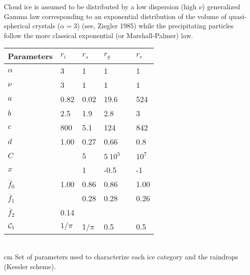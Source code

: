 Cloud ice is assumed to be distributed by a low dispersion (high $\nu$)
generalized Gamma law corresponding to an exponential distribution of the volume
of quasi-spherical crystals ($\alpha = 3$) (see, Ziegler 1985) while the
precipitating particles follow the more classical exponential (or
Marshall-Palmer) law.

\begin{center}\label{table2}
\begin{tabular}{|l|l|l|l|l|l|}
\hline
Parameters & $r_i$ & $r_s$ & $r_g$ && $r_r$  \\
\hline \hline
$\alpha$ & 3 & 1 & 1 && 1 \\
$\nu$    & 3 & 1 & 1 && 1 \\
\hline
$a$ & 0.82 & 0.02 & 19.6 && 524 \\
$b$ & 2.5  & 1.9  & 2.8 && 3   \\
\hline
$c$ & 800  & 5.1  & 124 && 842 \\
$d$ & 1.00 & 0.27 & 0.66 && 0.8 \\
\hline
$C$ & & 5 & $5\ 10^5$ && $10^7$ \\
$x$ & & 1 &    -0.5   &&   -1   \\
\hline
$\overline{f}_0$ & 1.00 & 0.86 & 0.86 && 1.00 \\
$\overline{f}_1$ &      & 0.28 & 0.28 && 0.26 \\
$\overline{f}_2$ & 0.14 &      &      &&      \\
\hline
${\cal C}_{1}$ & $1/\pi$ & 1/$\pi$ & 0.5 && 0.5 \\
\hline
\end{tabular}
\\
 cm
Set of parameters used to characterize each ice category and the raindrops
(Kessler scheme).
\end{center}

